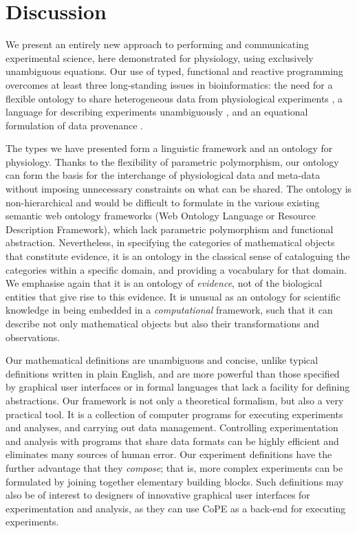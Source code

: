 \section*{Discussion}

We present an entirely new approach to performing and communicating
experimental science, here demonstrated for physiology, using
exclusively unambiguous equations.  Our use of typed, functional and
reactive programming overcomes at least three long-standing issues in
bioinformatics: the need for a flexible ontology to share
heterogeneous data from physiological experiments \cite{Amari2002}, a
language for describing experiments unambiguously
\cite{Murray-Rust2002}, and an equational formulation of data
provenance \cite{Pool2002}.

The types we have presented form a linguistic framework and an
ontology for physiology. Thanks to the flexibility of parametric polymorphism,
our ontology can form the basis for the interchange of physiological data
and meta-data without imposing unnecessary constraints on what can be
shared. The ontology is non-hierarchical and would be difficult to
formulate in the various existing semantic web ontology frameworks
(Web Ontology Language or Resource Description Framework), which lack
parametric polymorphism and functional abstraction. Nevertheless, in
specifying the categories of mathematical objects that constitute
evidence, it is an ontology in the classical sense of cataloguing the
categories within a specific domain, and providing a vocabulary for
that domain. We emphasise again that it is an ontology of
\emph{evidence}, not of the biological entities that give rise to this
evidence. It is unusual as an ontology for scientific knowledge in
being embedded in a \emph{computational} framework, such that it can
describe not only mathematical objects but also their transformations
and observations.

%
% 
%
Our mathematical definitions are unambiguous and concise, unlike
typical definitions written in plain English,
and are more powerful than those specified
by graphical user interfaces or in formal languages that lack a
facility for defining abstractions. Our framework is not only a
theoretical formalism, but also a very practical tool. It is a
collection of computer programs for executing experiments and
analyses, and carrying out data management. Controlling
experimentation and analysis with programs that share data formats can
be highly efficient and eliminates many sources of human error. Our
experiment definitions have the further advantage that they
\emph{compose}; that is, more complex experiments can be formulated by
joining together elementary building blocks. Such definitions may also
be of interest to designers of innovative graphical user interfaces
for experimentation and analysis, as they can use CoPE as a back-end
for executing experiments.

